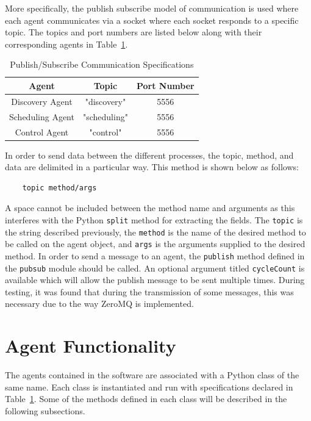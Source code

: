 More specifically, the publish subscribe model of communication is used where
each agent communicates via a socket where each socket responds to a specific
topic. The topics and port numbers are listed below along with their
corresponding agents in Table~\ref{tab:pubsubspecs}. %
%
\begin{table}
    \centering
    \begin{tabular}{|c|c|c|}
        \hline
        Agent & Topic & Port Number\\
        \hline
        Discovery Agent & "discovery" & 5556\\
        Scheduling Agent & "scheduling" & 5556\\
        Control Agent & "control" & 5556\\
        \hline
    \end{tabular}
    \caption{Publish/Subscribe Communication Specifications}
    \label{tab:pubsubspecs}
\end{table}
%
In order to send data between the different processes, the topic, method, and
data are delimited in a particular way. This method is shown below as follows: %
%
\begin{verbatim}
    topic method/args
\end{verbatim}
%
A space cannot be included between the method name and arguments as this
interferes with the Python \texttt{split} method for extracting the fields. The
\texttt{topic} is the string described previously, the \texttt{method} is the
name of the desired method to be called on the agent object, and \texttt{args}
is the arguments supplied to the desired method. In order to send a message to
an agent, the \texttt{publish} method defined in the \texttt{pubsub} module
should be called. An optional argument titled \texttt{cycleCount} is available
which will allow the publish message to be sent multiple times. During testing,
it was found that during the transmission of some messages, this was necessary
due to the way ZeroMQ is implemented.

\section{Agent Functionality}
The agents contained in the software are associated with a Python class of the
same name. Each class is instantiated and run with specifications declared in
Table~\ref{tab:pubsubspecs}. Some of the methods defined in each class will be
described in the following subsections.

